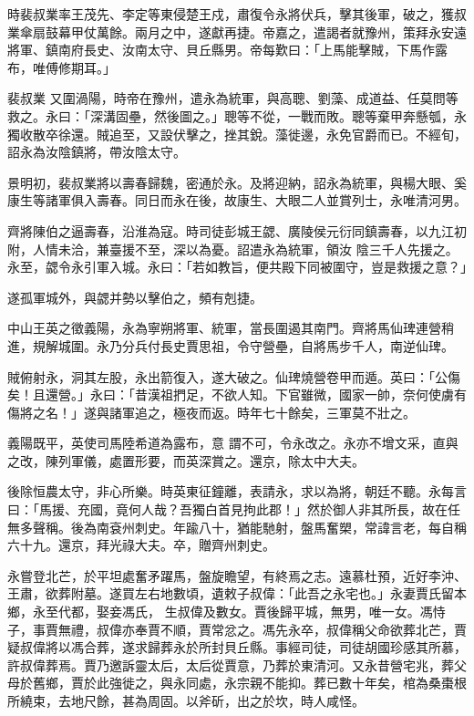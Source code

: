 \begin{pinyinscope}
 時裴叔業率王茂先、李定等東侵楚王戍，肅復令永將伏兵，擊其後軍，破之，獲叔業傘扇鼓幕甲仗萬餘。兩月之中，遂獻再捷。帝嘉之，遣謁者就豫州，策拜永安遠將軍、鎮南府長史、汝南太守、貝丘縣男。帝每歎曰：「上馬能擊賊，下馬作露布，唯傅修期耳。」



 裴叔業
 又圍渦陽，時帝在豫州，遣永為統軍，與高聰、劉藻、成道益、任莫問等救之。永曰：「深溝固壘，然後圖之。」聰等不從，一戰而敗。聰等棄甲奔懸瓠，永獨收散卒徐還。賊追至，又設伏擊之，挫其銳。藻徙邊，永免官爵而已。不經旬，詔永為汝陰鎮將，帶汝陰太守。



 景明初，裴叔業將以壽春歸魏，密通於永。及將迎納，詔永為統軍，與楊大眼、奚康生等諸軍俱入壽春。同日而永在後，故康生、大眼二人並賞列士，永唯清河男。



 齊將陳伯之逼壽春，沿淮為寇。時司徒彭城王勰、廣陵侯元衍同鎮壽春，以九江初附，人情未洽，兼臺援不至，深以為憂。詔遣永為統軍，領汝
 陰三千人先援之。永至，勰令永引軍入城。永曰：「若如教旨，便共殿下同被圍守，豈是救援之意？」



 遂孤軍城外，與勰并勢以擊伯之，頻有剋捷。



 中山王英之徵義陽，永為寧朔將軍、統軍，當長圍遏其南門。齊將馬仙琕連營稍進，規解城圍。永乃分兵付長史賈思祖，令守營壘，自將馬步千人，南逆仙琕。



 賊俯射永，洞其左股，永出箭復入，遂大破之。仙琕燒營卷甲而遁。英曰：「公傷矣！且還營。」永曰：「昔漢祖捫足，不欲人知。下官雖微，國家一帥，奈何使虜有傷將之名！」遂與諸軍追之，極夜而返。時年七十餘矣，三軍莫不壯之。



 義陽既平，英使司馬陸希道為露布，意
 謂不可，令永改之。永亦不增文采，直與之改，陳列軍儀，處置形要，而英深賞之。還京，除太中大夫。



 後除恒農太守，非心所樂。時英東征鐘離，表請永，求以為將，朝廷不聽。永每言曰：「馬援、充國，竟何人哉？吾獨白首見拘此郡！」然於御人非其所長，故在任無多聲稱。後為南袞州刺史。年踰八十，猶能馳射，盤馬奮槊，常諱言老，每自稱六十九。還京，拜光祿大夫。卒，贈齊州刺史。



 永嘗登北芒，於平坦處奮矛躍馬，盤旋瞻望，有終焉之志。遠慕杜預，近好李沖、王肅，欲葬附墓。遂買左右地數頃，遺敕子叔偉：「此吾之永宅也。」永妻賈氏留本鄉，永至代都，娶妾馮氏，
 生叔偉及數女。賈後歸平城，無男，唯一女。馮恃子，事賈無禮，叔偉亦奉賈不順，賈常忿之。馮先永卒，叔偉稱父命欲葬北芒，賈疑叔偉將以馮合葬，遂求歸葬永於所封貝丘縣。事經司徒，司徒胡國珍感其所慕，許叔偉葬焉。賈乃邀訴靈太后，太后從賈意，乃葬於東清河。又永昔營宅兆，葬父母於舊鄉，賈於此強徙之，與永同處，永宗親不能抑。葬已數十年矣，棺為桑棗根所繞束，去地尺餘，甚為周固。以斧斫，出之於坎，時人咸怪。




\end{pinyinscope}
